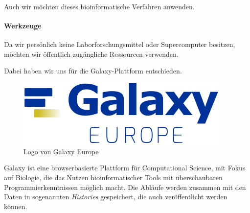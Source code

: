 \documentclass[10pt]{article}
\begin{document}
    Auch wir möchten dieses bioinformatische Verfahren anwenden.

    \paragraph{Werkzeuge}
    Da wir persönlich keine Laborforschungsmittel oder Supercomputer besitzen, möchten wir öffentlich zugängliche
    Ressourcen verwenden.

    Dabei haben wir uns für die Galaxy-Plattform entschieden.

    \begin{figure}
        \includegraphics[width=\linewidth]{Galaxy-logo}
        \caption{Logo von Galaxy Europe}
    \end{figure}

    Galaxy ist eine browserbasierte Plattform für Computational Science, mit Fokus auf Biologie, die das Nutzen
    bioinformatischer Tools mit überschaubaren Programmierkenntnissen möglich macht. Die Abläufe werden
    zusammen mit den Daten in sogenannten \emph{Histories} gespeichert,
    die auch veröffentlicht werden können.\cite{17, 26}
\end{document}
